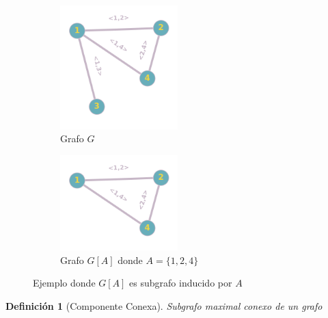\documentclass[a4paper,1pt]{report}
\newtheorem*{dfn}{Definición}
\begin{document}
\begin{figure}[H]
    \centering
    \begin{subfigure}[b]{0.45\textwidth}
    \centering
    \includegraphics[width=0.5\textwidth]{figures/grafo2.png}
    \caption{Grafo $G$}
    \end{subfigure}
    \begin{subfigure}[b]{0.45\textwidth}
        \centering
    \includegraphics[width=0.5\textwidth]{figures/clique1.png}
    \caption{Grafo $G[A]$ donde $A = \{1,2,4\}$}
    \end{subfigure}
    \caption{Ejemplo donde $G[A]$ es subgrafo inducido por $A$}
    \end{figure} 

\begin{dfn}[Componente Conexa]
    Subgrafo maximal conexo de un grafo
\end{dfn}
\end{document}
